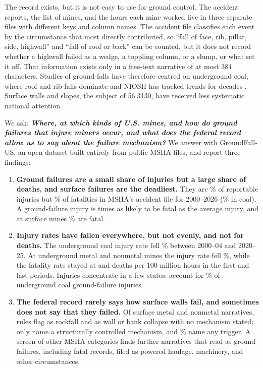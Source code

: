 \documentclass[letterpaper,twocolumn,10pt]{article}
\begin{document}
The record exists, but it is not easy to use for ground control. The accident reports, the list of mines, and the hours each mine worked live in three separate files with different keys and column names. The accident file classifies each event by the circumstance that most directly contributed, so ``fall of face, rib, pillar, side, highwall'' and ``fall of roof or back'' can be counted, but it does not record whether a highwall failed as a wedge, a toppling column, or a slump, or what set it off. That information exists only in a free-text narrative of at most 384 characters. Studies of ground falls have therefore centred on underground coal, where roof and rib falls dominate and NIOSH has tracked trends for decades \citep{MarkPappasBarczak2009,PappasMark2012,Khademian2022}. Surface walls and slopes, the subject of 56.3130, have received less systematic national attention.

We ask: \textbf{\textit{Where, at which kinds of U.S. mines, and how do ground failures that injure miners occur, and what does the federal record allow us to say about the failure mechanism?}} We answer with GroundFall-US, an open dataset built entirely from public MSHA files, and report three findings:
\begin{enumerate}
\item \textbf{Ground failures are a small share of injuries but a large share of deaths, and surface failures are the deadliest.} They are \PctGFofInjury\% of reportable injuries but \PctGFofFatal\% of fatalities in MSHA's accident file for 2000--2026 (\PctGFofFatalCoal\% in coal). A ground-failure injury is \CFRRatio{} times as likely to be fatal as the average injury, and at surface mines \CFRSurf\% are fatal.
\item \textbf{Injury rates have fallen everywhere, but not evenly, and not for deaths.} The underground coal injury rate fell \RateDropCUG\% between 2000--04 and 2020--25. At underground metal and nonmetal mines the injury rate fell \RateDropMUG\%, while the fatality rate stayed at \FRateFirstMUG{} and \FRateLastMUG{} deaths per 100 million hours in the first and last periods. Injuries concentrate in a few states: \TopThreeCUG{} account for \TopThreeShareCUG\% of underground coal ground-failure injuries.
\item \textbf{The federal record rarely says how surface walls fail, and sometimes does not say that they failed.} Of \NCoded{} surface metal and nonmetal narratives, rules flag \ModeRockfall{} as rockfall and \ModeCollapseMechanismUnstated{} as wall or bank collapse with no mechanism stated; only \NMechanismNamed{} name a structurally controlled mechanism, and \PctTrigAny\% name any trigger. A screen of other MSHA categories finds \NCand{} further narratives that read as ground failures, including \NCandFatal{} fatal records, filed as powered haulage, machinery, and other circumstances.
\end{enumerate}
\end{document}
